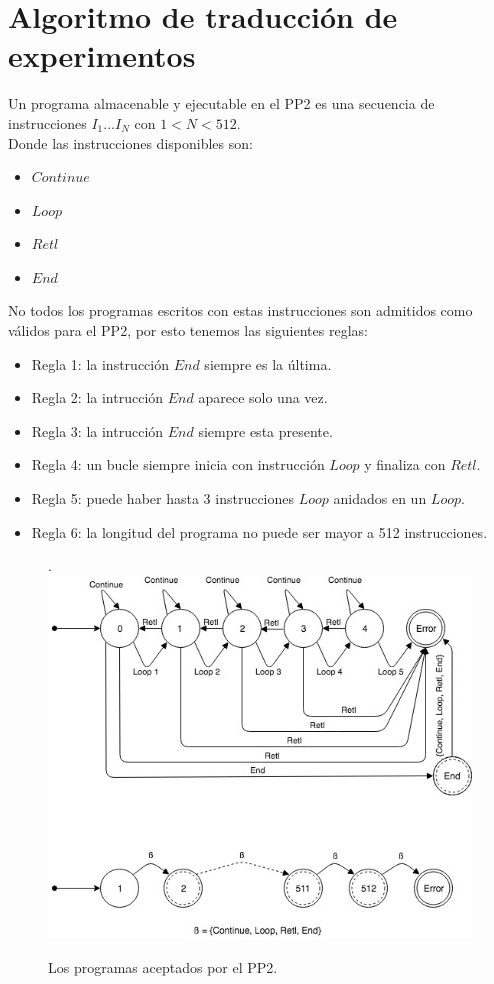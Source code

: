 \section{Algoritmo de traducci\'on de experimentos}

Un programa almacenable y ejecutable en el PP2 es una secuencia de 
instrucciones \(I_{1} ... I_{N}\) con \(1 < N < 512 \).
\\
Donde las instrucciones disponibles son:

\begin{itemize}
    \item $Continue$
    \item $Loop$
    \item $Retl$
    \item $End$
\end{itemize}

\noindent
No todos los programas escritos con estas instrucciones son admitidos 
como v\'alidos para el PP2, por esto tenemos las siguientes reglas:

\begin{itemize}
\item Regla 1: la instrucci\'on $End$ siempre es la \'ultima.
\item Regla 2: la intrucci\'on $End$ aparece solo una vez.
\item Regla 3: la intrucci\'on $End$ siempre esta presente.
\item Regla 4: un bucle siempre inicia con instrucci\'on $Loop$ y finaliza con $Retl$.
\item Regla 5: puede haber hasta 3 instrucciones $Loop$ anidados en un $Loop$.
\item Regla 6: la longitud del programa no puede ser mayor a 512 instrucciones.
\end{itemize}

\begin{figure}[!htb].
    \includegraphics[width=\linewidth]{../figures/d12.jpg}
    \caption{Los programas aceptados por el PP2.}
    \label{fig:d12}
\end{figure}
 
